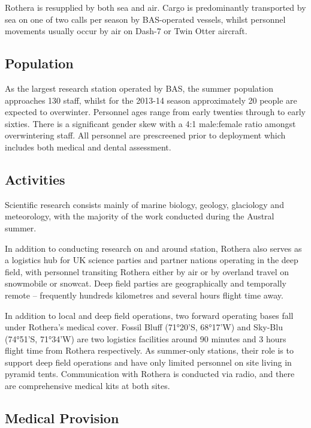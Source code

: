 \documentclass[12pt,a4paper]{article}
\begin{document}
Rothera is resupplied by both sea and air. Cargo is predominantly transported by sea on one of two calls per season by BAS-operated vessels, whilst personnel movements usually occur by air on Dash-7 or Twin Otter aircraft.

\subsection{Population}

As the largest research station operated by BAS, the summer population approaches 130 staff, whilst for the 2013-14 season approximately 20 people are expected to overwinter. Personnel ages range from early twenties through to early sixties. There is a significant gender skew with a 4:1 male:female ratio amongst overwintering staff. All personnel are prescreened prior to deployment which includes both medical and dental assessment.

\subsection{Activities}

 Scientific research consists mainly of marine biology, geology, glaciology and meteorology, with the majority of the work conducted during the Austral summer.

In addition to conducting research on and around station, Rothera also serves as a logistics hub for UK science parties and partner nations operating in the deep field, with personnel transiting Rothera either by air or by overland travel on snowmobile or snowcat. Deep field parties are geographically and temporally remote -- frequently hundreds kilometres and several hours flight time away.

In addition to local and deep field operations, two forward operating bases fall under Rothera's medical cover. Fossil Bluff (71°20'S, 68°17'W) and Sky-Blu (74°51'S, 71°34'W) are two logistics facilities around 90 minutes and 3 hours flight time from Rothera respectively. As summer-only stations, their role is to support deep field operations and have only limited personnel on site living in pyramid tents. Communication with Rothera is conducted via radio, and there are comprehensive medical kits at both sites.

\subsection{Medical Provision}
\end{document}

